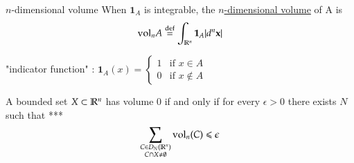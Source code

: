 \begin{defn}{$n$-dimensional volume}
	When $\bm{1}_A$ is integrable, the \ul{$n$-dimensional volume} of A is
	\begin{equation}
		\text{vol}_n A \overset{\text{def}}{=} \int_{\mathbb{R}^n} \textbf{1}_A |d^n \textbf{x}|
	\end{equation}
\end{defn}

"indicator function" : $\bm{1}_A (x) = \begin{cases}
	1 &\text{if }x\in A \\
	0 &\text{if }x\not\in A
\end{cases}$

\begin{proposition}  A bounded set $X\subset \mathbb{R}^n$ has volume $0$ if and only if for every $\epsilon > 0$ there exists $N$ such that ***
\begin{equation}
	\sum_{\substack{C\in D_N(\mathbb{R}^n) \\ C \cap X \neq \emptyset}} \mathrm{vol}_n (C) \leqslant \epsilon
\end{equation}
\end{proposition}

